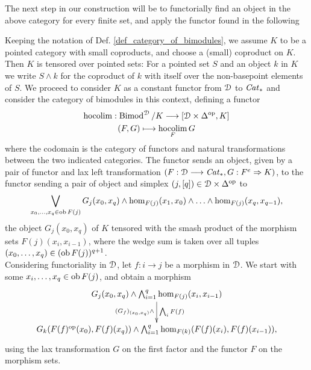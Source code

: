     The next step in our construction will be to functorially find an object in the above category for every finite set, and apply the functor found in the following
    \begin{defn}\label{def_hocolim}
      Keeping the notation of Def. \ref{def_category_of_bimodules}, we assume $K$ to be a pointed category with small coproducts, and choose a (small) coproduct on $K$.
      Then $K$ is tensored over pointed sets: For a pointed set $S$ and an object $k$ in $K$ we write $S \wedge k$ for the coproduct of $k$ with itself over the non-basepoint elements of $S$.
      We proceed to consider $K$ as a constant functor from $\mathcal{D}$ to $\mathit{Cat}_*$ and consider the category of bimodules in this context, defining a functor
      \begin{gather*}
        \operatorname*{hocolim}: \operatorname{Bimod}^{\mathcal{D}} / K \longrightarrow [\mathcal{D} \times \Delta^{\mathrm{op}}, K]\\
        (F,G) \longmapsto \operatorname*{hocolim}_F G
      \end{gather*}
      where the codomain is the category of functors and natural transformations between the two indicated categories.
      The functor sends an object, given by a pair of functor and lax left transformation $(F: \mathcal{D} \longrightarrow \mathit{Cat}_*, G: F^e \Rightarrow K)$, to the functor sending a pair of object and simplex $(j,[q]) \in \mathcal{D} \times \Delta^\mathrm{op}$ to
      \begin{displaymath}
        \bigvee_{x_0, \ldots, x_q \in \ob F(j)} %
          G_j(x_0,x_q) \wedge %
          \hom_{F(j)}(x_1,x_0) \wedge \ldots \wedge \hom_{F(j)}(x_q,x_{q-1}),
      \end{displaymath}
      the object $G_j(x_0,x_q)$ of $K$ tensored with the smash product of the morphism sets $F(j)(x_i,x_{i-1})$, where the wedge sum is taken over all tuples $(x_0, \ldots, x_q) \in (\operatorname{ob} F(j))^{q+1}$.\\
      Considering functoriality in $\mathcal{D}$, let $f: i \to j$ be a morphism in $\mathcal{D}$.
      We start with some $x_i, \ldots, x_q \in \operatorname{ob} F(j)$, and obtain a morphism
      \begin{displaymath}
        \xymatrix{
          G_j(x_0,x_q) \wedge \bigwedge_{i=1}^q \hom_{F(j)}(x_i,x_{i-1}) %
            \ar[d]_{(G_f)_{(x_0,x_q)} \wedge}^{\bigwedge_i F(f)}
          \\
          G_k(F(f)^{\mathrm{op}}(x_0),F(f)(x_q)) \wedge %
            \bigwedge_{i=1}^q \hom_{F(k)}(F(f)(x_i),F(f)(x_{i-1})),  
        }
      \end{displaymath}
      using the lax transformation $G$ on the first factor and the functor $F$ on the morphism sets.

\end{defn}
